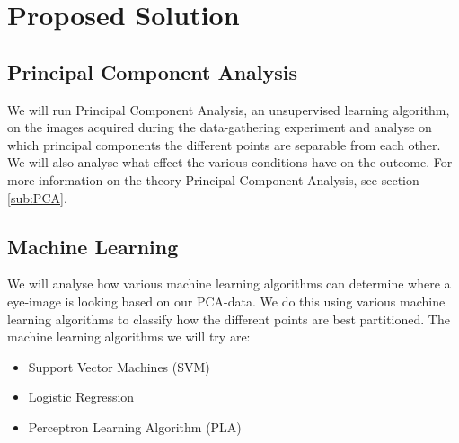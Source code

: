 \section{Proposed Solution}
\label{sec:ProposedSolution}
\subsection{Principal Component Analysis}
We will run Principal Component Analysis, an unsupervised learning algorithm, on the images acquired during the data-gathering experiment and analyse on which principal components the different points are separable from each other.
We will also analyse what effect the various conditions have on the outcome. %
For more information on the theory Principal Component Analysis, see section \ref{sub:PCA}.

\subsection{Machine Learning}
We will analyse how various machine learning algorithms can determine where a eye-image is looking based on our PCA-data.
We do this using various machine learning algorithms to classify how the different points are best partitioned.
The machine learning algorithms we will try are:
\begin{itemize}
	\item{Support Vector Machines (SVM)}
	\item{Logistic Regression}
	\item{Perceptron Learning Algorithm (PLA)}
\end{itemize}





